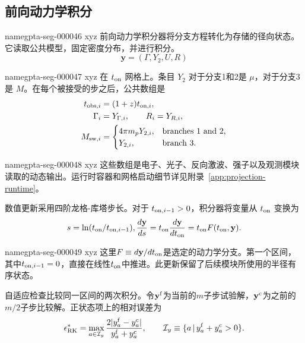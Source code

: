 \documentclass[twocolumn]{aastex702}
\makeatletter
\providecommand{\gptareaderanchor}[1]{\pdfdest name{#1} xyz}%
\providecommand{\gptareaderanchor}[1]{\special{pdf:dest (#1) [ @thispage /XYZ @xpos @ypos null ]}}%
\makeatother
\begin{document}
\subsection{前向动力学积分}


\gptareaderanchor{gpta-seg-000046}%
前向动力学积分器将分支方程转化为存储的径向状态。它读取公共模型，固定密度分布，并进行积分。
\begin{equation}
\mathbf{y}=(\Gamma,Y_2,U,R)
\end{equation}

\gptareaderanchor{gpta-seg-000047}%
在 \(t_{\rm on}\) 网格上。条目 \(Y_2\) 对于分支1和2是 \(\mu\)，对于分支3是 \(M\)。在每个被接受的步之后，公共数组是
\begin{equation}
\begin{aligned}
t_{{\rm obs},i}&=(1+z)t_{{\rm on},i},\\
\Gamma_i&=Y_{\Gamma,i},\qquad R_i=Y_{R,i},\\
M_{{\rm sw},i}&=
\begin{cases}
4\pi m_pY_{2,i},
& \text{branches 1 and 2},\\
Y_{2,i},
& \text{branch 3}.
\end{cases}
\end{aligned}
\end{equation}

\gptareaderanchor{gpta-seg-000048}%
这些数组是电子、光子、反向激波、强子以及观测模块读取的动态输出。运行时容器和网格启动细节详见附录~\ref{app:projection-runtime}。

数值更新采用四阶龙格-库塔步长。对于 \(t_{{\rm on},i-1}>0\)，积分器将变量从 \(t_{\rm on}\) 变换为
\begin{equation}
\begin{aligned}
s=\ln(t_{\rm on}/t_{{\rm on},i-1}),
\frac{d\mathbf{y}}{ds}
=t_{\rm on}\frac{d\mathbf{y}}{dt_{\rm on}}
=t_{\rm on}F(t_{\rm on},\mathbf{y}).
\end{aligned}
\end{equation}

\gptareaderanchor{gpta-seg-000049}%
这里\(F\equiv d\mathbf{y}/dt_{\rm on}\)是选定的动力学分支。第一个区间，其中\(t_{{\rm on},i-1}=0\)，直接在线性\(t_{\rm on}\)中推进。此更新保留了后续模块所使用的半径有序状态。

自适应检查比较同一区间的两次积分。令\(\mathbf{y}^{\rm f}\)为当前的\(m\)子步试验解，\(\mathbf{y}^{\rm c}\)为之前的\(m/2\)子步比较解。正状态项上的相对误差为
\begin{equation}
\epsilon_{\rm RK}^\ast=
\max_{a\in\mathcal{I}_y}
\frac{2|y_a^{\rm f}-y_a^{\rm c}|}
{y_a^{\rm f}+y_a^{\rm c}},
\qquad
\mathcal{I}_y\equiv\{a\,|\,y_a^{\rm f}+y_a^{\rm c}>0\}.
\end{equation}
\end{document}
